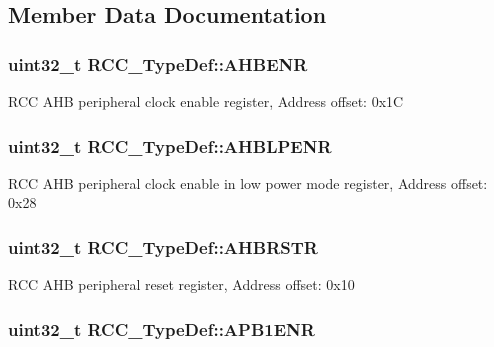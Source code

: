 \subsection{Member Data Documentation}
\hypertarget{struct_r_c_c___type_def_abaebc9204bbc1708356435a5a01e70eb}{
\subsubsection[{A\-H\-B\-E\-N\-R}]{ uint32\-\_\-t R\-C\-C\-\_\-\-Type\-Def\-::\-A\-H\-B\-E\-N\-R}}\label{struct_r_c_c___type_def_abaebc9204bbc1708356435a5a01e70eb}
R\-C\-C A\-H\-B peripheral clock enable register, Address offset\-: 0x1\-C \hypertarget{struct_r_c_c___type_def_a5a89bd730b7710a0e24d068cb6e4c90f}{
\subsubsection[{A\-H\-B\-L\-P\-E\-N\-R}]{ uint32\-\_\-t R\-C\-C\-\_\-\-Type\-Def\-::\-A\-H\-B\-L\-P\-E\-N\-R}}\label{struct_r_c_c___type_def_a5a89bd730b7710a0e24d068cb6e4c90f}
R\-C\-C A\-H\-B peripheral clock enable in low power mode register, Address offset\-: 0x28 \hypertarget{struct_r_c_c___type_def_a46a098b026c5e85770e7a7f05a35d49c}{
\subsubsection[{A\-H\-B\-R\-S\-T\-R}]{ uint32\-\_\-t R\-C\-C\-\_\-\-Type\-Def\-::\-A\-H\-B\-R\-S\-T\-R}}\label{struct_r_c_c___type_def_a46a098b026c5e85770e7a7f05a35d49c}
R\-C\-C A\-H\-B peripheral reset register, Address offset\-: 0x10 \hypertarget{struct_r_c_c___type_def_aec7622ba90341c9faf843d9ee54a759f}{
\subsubsection[{A\-P\-B1\-E\-N\-R}]{ uint32\-\_\-t R\-C\-C\-\_\-\-Type\-Def\-::\-A\-P\-B1\-E\-N\-R}}\label{struct_r_c_c___type_def_aec7622ba90341c9faf843d9ee54a759f}
